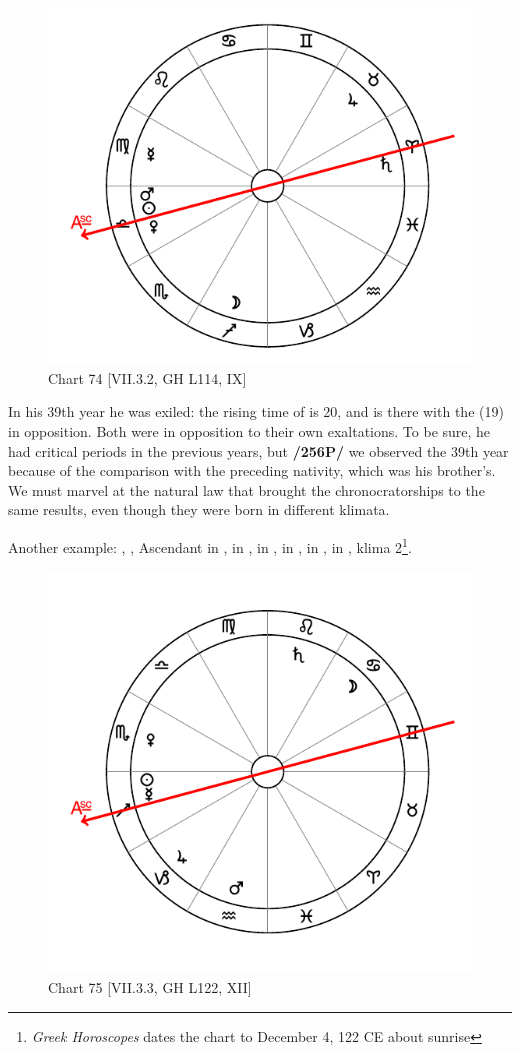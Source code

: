 \begin{figure}
\centering
\vspace{-20pt}
\includegraphics[width=.68\textwidth]{charts/7_3_2}
\caption{Chart 74 [VII.3.2, GH L114, IX]}
\label{fig:chart74}
\end{figure}

In his 39th year he was exiled: the rising time of \Aries\xspace is 20, and \Saturn\xspace is there with the \Sun\xspace (19) in opposition. Both were in opposition to their own exaltations. To be sure, he had critical periods in the previous years, but \textbf{/256P/} we observed the 39th year because of the comparison with the preceding nativity, which was his brother’s. We must marvel at the natural law that brought the chronocratorships to the same results, even though they were born in different klimata.

\newpage
Another example: \Sun, \Mercury, Ascendant in \Sagittarius, \Moon\xspace in \Cancer, \Saturn\xspace in \Leo, \Jupiter\xspace in
\Capricorn, \Mars\xspace in \Aquarius, \Venus\xspace in \Scorpio, klima 2\footnote{\textit{Greek Horoscopes} dates the chart to December 4, 122 CE about sunrise}.

\begin{figure}
\centering
\vspace{-20pt}
\includegraphics[width=.68\textwidth]{charts/7_3_3}
\caption{Chart 75 [VII.3.3, GH L122, XII]}
\label{fig:chart75}
\end{figure}



